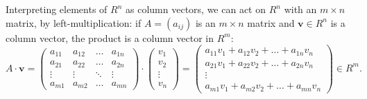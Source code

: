   Interpreting elements of $R^n$ as column vectors, we can act on
  $R^n$ with an $m \times n$ matrix, by left-multiplication: if
  $A = (a_{ij})$ is an $m \times n$ matrix and $\mathbf{v} \in R^n$ is
  a column vector, the product is a column vector in $R^m$:
  \[
    A \cdot \mathbf{v} =
    \begin{pmatrix}
      a_{11} & a_{12} & \dots & a_{1n} \\
      a_{21} & a_{22} & \dots & a_{2n} \\
      \vdots & \vdots & \ddots & \vdots \\
      a_{m1} & a_{m2} & \dots & a_{mn}
    \end{pmatrix}
    \cdot
    \begin{pmatrix} v_1 \\ v_2 \\ \vdots \\ v_n \end{pmatrix} =
    \begin{pmatrix}
      a_{11}v_1 + a_{12}v_2 + \dots + a_{1n}v_n \\
      a_{21}v_1 + a_{22}v_2 + \dots + a_{2n}v_n \\
      \vdots \\
      a_{m1}v_1 + a_{m2}v_2 + \dots + a_{mn}v_n
    \end{pmatrix}
    \in R^m.
  \]

